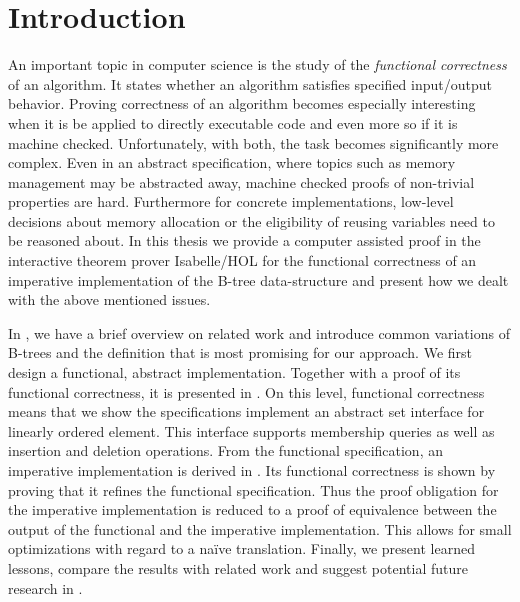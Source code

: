 

\chapter{Introduction}\label{chapter:introduction}

An important topic in computer science is the study of the
\textit{functional correctness} of an algorithm.
It states whether an algorithm satisfies specified
input/output behavior.
Proving correctness of an algorithm
becomes especially interesting when it is be applied
to directly executable code and even more so if it is machine checked.
Unfortunately, with both, the task becomes
significantly more complex.
Even in an abstract specification, where topics such as
memory management may be abstracted away,
machine checked proofs of non-trivial properties
are hard.
Furthermore for concrete implementations,
low-level decisions about memory allocation or
the eligibility of reusing variables need to be
reasoned about.
In this thesis we provide a computer assisted proof in the interactive
theorem prover Isabelle/HOL \parencite{DBLP:books/sp/NipkowPW02} for the functional
correctness of an imperative implementation of the B-tree data-structure
and present how we dealt with the above mentioned issues.

In , we have a brief overview on related
work and introduce common variations of B-trees and
the definition that is most promising for our approach.
We first design a functional, abstract implementation.
Together with a proof of its functional correctness,
it is presented in .
On this level, functional correctness means that we show the specifications
implement an abstract set interface for linearly ordered element.
This interface supports membership queries as well as insertion and deletion operations.
From the functional specification, an imperative implementation is derived in .
Its functional correctness is shown by proving that it refines the functional specification.
Thus the proof obligation for the imperative implementation
is reduced to a proof of equivalence between the output of the
functional and the imperative implementation.
This allows for small optimizations with regard to a na\"ive translation.
Finally, we present learned lessons, compare the results with related work and suggest potential future
research in .

